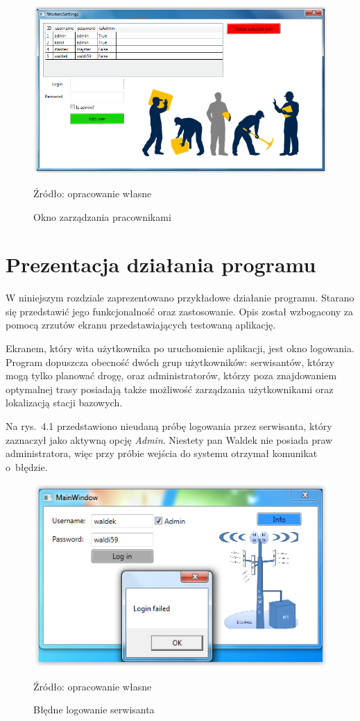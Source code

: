 \documentclass[12pt,a4paper]{report}
\begin{document}
\begin{figure}[!bht]
\centering
\includegraphics[scale=0.5]{Pictures/WorkerSettings.png}
\label{fig: WorkerSettings}
\caption{Okno zarządzania pracownikami}{Źródło: opracowanie własne}
\end{figure}

\chapter{Prezentacja działania programu}

W niniejszym rozdziale zaprezentowano przykładowe działanie programu. Starano się przedstawić jego funkcjonalność oraz zastosowanie. Opis został wzbogacony za pomocą zrzutów ekranu przedstawiających testowaną aplikację.

Ekranem, który wita użytkownika po uruchomienie aplikacji, jest okno logowania. Program dopuszcza obecność dwóch grup użytkowników: serwisantów, którzy mogą tylko planować drogę, oraz administratorów, którzy poza znajdowaniem optymalnej trasy posiadają także możliwość zarządzania użytkownikami oraz lokalizacją stacji bazowych.

Na rys.~4.1 przedstawiono nieudaną próbę logowania przez serwisanta, który zaznaczył jako aktywną opcję \textit{Admin}. Niestety pan Waldek nie posiada praw administratora, więc przy próbie wejścia do systemu otrzymał komunikat o~błędzie.

\begin{figure}[!bht]
\centering
\includegraphics[scale=1]{Pictures/LoginFailedWaldek.png}
\label{fig: LoginFailedWaldek}
\caption{Błędne logowanie serwisanta}{Źródło: opracowanie własne}
\end{figure}
\end{document}

